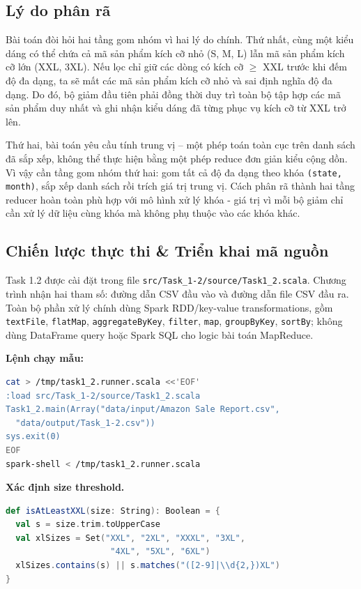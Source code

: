 \subsection{Lý do phân rã}
Bài toán đòi hỏi hai tầng gom nhóm vì hai lý do chính. Thứ nhất, cùng một kiểu dáng có thể chứa cả mã sản phẩm kích cỡ nhỏ (S, M, L) lẫn mã sản phẩm kích cỡ lớn (XXL, 3XL). Nếu lọc chỉ giữ các dòng có kích cỡ $\geq$ XXL trước khi đếm độ đa dạng, ta sẽ mất các mã sản phẩm kích cỡ nhỏ và sai định nghĩa độ đa dạng. Do đó, bộ giảm đầu tiên phải đồng thời duy trì toàn bộ tập hợp các mã sản phẩm duy nhất và ghi nhận kiểu dáng đã từng phục vụ kích cỡ từ XXL trở lên.

Thứ hai, bài toán yêu cầu tính trung vị -- một phép toán toàn cục trên danh sách đã sắp xếp, không thể thực hiện bằng một phép reduce đơn giản kiểu cộng dồn. Vì vậy cần tầng gom nhóm thứ hai: gom tất cả độ đa dạng theo khóa \texttt{(state, month)}, sắp xếp danh sách rồi trích giá trị trung vị. Cách phân rã thành hai tầng reducer hoàn toàn phù hợp với mô hình xử lý khóa - giá trị vì mỗi bộ giảm chỉ cần xử lý dữ liệu cùng khóa mà không phụ thuộc vào các khóa khác.

\subsection{Chiến lược thực thi \& Triển khai mã nguồn}
Task 1.2 được cài đặt trong file \texttt{src/Task\_1-2/source/Task1\_2.scala}. Chương trình nhận hai tham số: đường dẫn CSV đầu vào và đường dẫn file CSV đầu ra. Toàn bộ phần xử lý chính dùng Spark RDD/key-value transformations, gồm \texttt{textFile}, \texttt{flatMap}, \texttt{aggregateByKey}, \texttt{filter}, \texttt{map}, \texttt{groupByKey}, \texttt{sortBy}; không dùng DataFrame query hoặc Spark SQL cho logic bài toán MapReduce.

\textbf{Lệnh chạy mẫu:}
\begin{lstlisting}[language=bash]
cat > /tmp/task1_2.runner.scala <<'EOF'
:load src/Task_1-2/source/Task1_2.scala
Task1_2.main(Array("data/input/Amazon Sale Report.csv",
  "data/output/Task_1-2.csv"))
sys.exit(0)
EOF
spark-shell < /tmp/task1_2.runner.scala
\end{lstlisting}

\textbf{Xác định size threshold.}
\begin{lstlisting}[language=Scala]
def isAtLeastXXL(size: String): Boolean = {
  val s = size.trim.toUpperCase
  val xlSizes = Set("XXL", "2XL", "XXXL", "3XL",
                     "4XL", "5XL", "6XL")
  xlSizes.contains(s) || s.matches("([2-9]|\\d{2,})XL")
}
\end{lstlisting}

